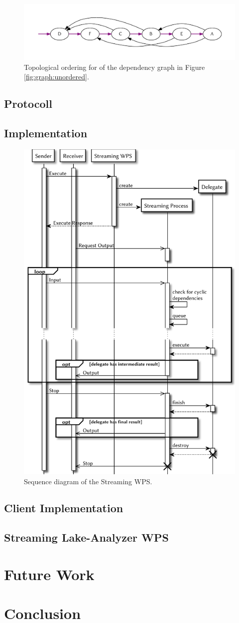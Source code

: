 	\begin{figure}[!htb]
		\centering
		\includegraphics[width=1\textwidth]{figures/ordered-graph.pdf} %
		\caption{\label{fig:graph:ordered} Topological ordering for of the dependency graph in Figure \ref{fig:graph:unordered}.}
	\end{figure}

	\subsection{Protocoll}
	\subsection{Implementation}
	\begin{figure}[!htb]
		\centering
		\includegraphics[width=.7868\textwidth]{figures/sequence-diagramm-swps.pdf}
		\caption{\label{fig:sd:swps} Sequence diagram of the Streaming WPS.}
	\end{figure}
	\subsection{Client Implementation}
	\subsection{Streaming Lake-Analyzer WPS}
\section{Future Work}
\section{Conclusion}